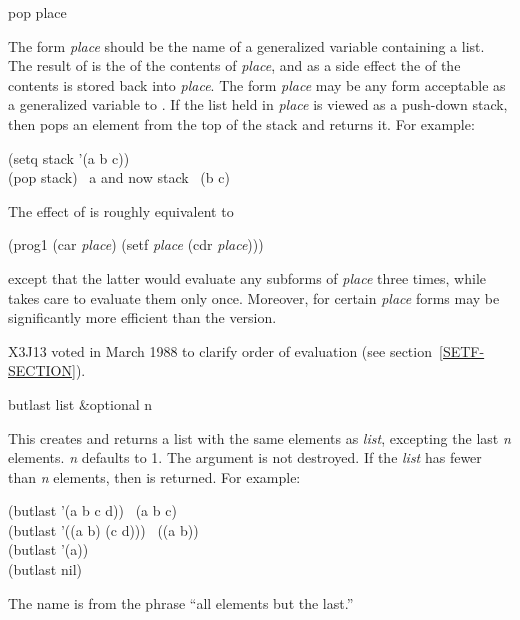 \begin{defmac}
pop place

The form {\it place} should be the name of a generalized variable
containing a list.  The result of  is the  of the contents
of {\it place}, and as a side effect the  of the contents is stored
back into {\it place}.  The form {\it place} may be any form acceptable as a
generalized variable to .  If the list held in {\it place} is
viewed as a push-down stack, then  pops an element from the top of
the stack and returns it.
For example:
\begin{lisp}
(setq stack '(a b c)) \\
(pop stack) \EV\ a  {\rm and now} stack \EV\ (b c)
\end{lisp}
The effect of  is roughly equivalent to
\begin{lisp}
(prog1 (car {\it place}) (setf {\it place} (cdr {\it place})))
\end{lisp}
except that the latter would evaluate any subforms of {\it place}
three times, while  takes care to evaluate them only once.
Moreover, for certain {\it place} forms  may be
significantly more efficient than the  version.
\begin{newer}
X3J13 voted in March 1988 
to clarify order of evaluation (see section~\ref{SETF-SECTION}).
\end{newer}
\end{defmac}

\begin{defun}[Function]
butlast list &optional n

This creates and returns a list with the same elements as {\it list},
excepting the last {\it n} elements.
{\it n} defaults to 1.  The argument is not destroyed.
If the {\it list} has fewer than {\it n} elements, then {\empty} is returned.
For example:
\begin{lisp}
(butlast '(a b c d)) \EV\ (a b c) \\
(butlast '((a b) (c d))) \EV\ ((a b)) \\
(butlast '(a)) \EV\ {\empty} \\
(butlast nil) \EV\ {\empty}
\end{lisp}
The name is from the phrase ``all elements but the last.''
\end{defun}

